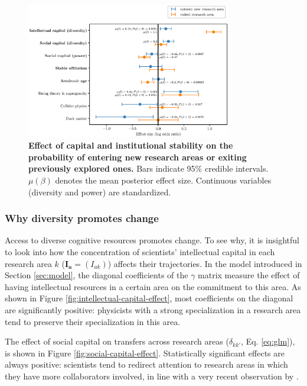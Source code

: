 \documentclass{article}
\begin{document}
\begin{figure}[h]
    \centering
    \includegraphics[width=0.8\textwidth]{Fig6.eps}
    \caption{\textbf{Effect of capital and institutional stability on the probability of entering new research areas or exiting previously explored ones.} Bars indicate 95\% credible intervals. $\mu(\beta)$ denotes the mean posterior effect size. Continuous variables (diversity and power) are standardized.}
    \label{fig:diversification_score_effect}
\end{figure}


\subsubsection{Why diversity promotes change}

Access to diverse cognitive resources promotes change. To see why, it is insightful to look into how the concentration of scientists' intellectual capital in each research area $k$ ($\bm{I_a}=(I_{ak})$) affects their trajectories. In the model introduced in Section \ref{sec:model}, the diagonal coefficients of the $\gamma$ matrix measure the effect of having intellectual resources in a certain area on the commitment to this area. As shown in Figure \ref{fig:intellectual-capital-effect}, most coefficients on the diagonal are significantly positive: physicists with a strong specialization in a research area tend to preserve their specialization in this area.

The effect of social capital on transfers across research areas ($\delta_{kk'}$, Eq. \ref{eq:glm}), is shown in Figure \ref{fig:social-capital-effect}. Statistically significant effects are always positive: scientists tend to redirect attention to research areas in which they have more collaborators involved, in line with a very recent observation by \citeauthor{Venturini2024} \citealt{Venturini2024}.
\end{document}
